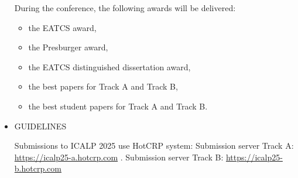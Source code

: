 \documentclass[prodmode,acmtecs]{acmsmall} %
\begin{document}
\begin{itemize}
  During the conference, the following awards will be delivered: 
 
\begin{itemize}\item  the EATCS award,
\item  the Presburger award,
\item  the EATCS distinguished dissertation award,
\item  the best papers for Track A and Track B,
\item  the best student papers for Track A and Track B.
\end{itemize} 
\item  GUIDELINES 
 
  Submissions to ICALP 2025 use HotCRP system: Submission server Track A: \href{https://icalp25-a.hotcrp.com}{https://icalp25-a.hotcrp.com} . Submission server Track B: \href{https://icalp25-b.hotcrp.com}{https://icalp25-b.hotcrp.com} 
 

\end{itemize}
\end{document}
